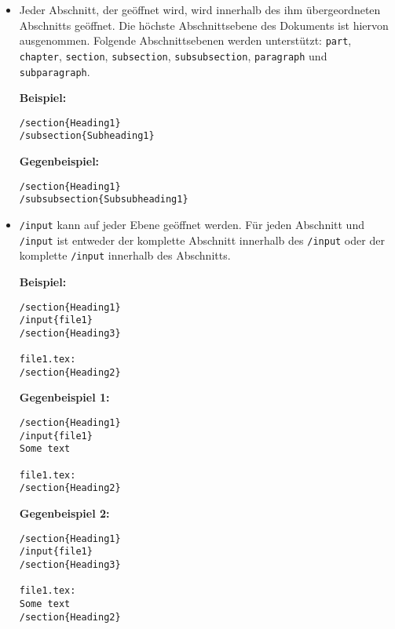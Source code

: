 \begin{itemize}
  \item Jeder Abschnitt, der geöffnet wird, wird innerhalb des ihm übergeordneten Abschnitts geöffnet.
  Die höchste Abschnittsebene des Dokuments ist hiervon ausgenommen.
  Folgende Abschnittsebenen werden unterstützt:
  \verb|part|, \verb|chapter|, \verb|section|, \verb|subsection|, \verb|subsubsection|, \verb|paragraph| und
  \verb|subparagraph|.

  \textbf{Beispiel:}
  \begin{verbatim}
/section{Heading1}
/subsection{Subheading1}
  \end{verbatim}

  \textbf{Gegenbeispiel:}
  \begin{verbatim}
/section{Heading1}
/subsubsection{Subsubheading1}
  \end{verbatim}

  \clearpage

  \item \verb|/input| kann auf jeder Ebene geöffnet werden.
  Für jeden Abschnitt und \verb|/input| ist entweder der komplette Abschnitt innerhalb des \verb|/input| oder der
  komplette \verb|/input| innerhalb des Abschnitts.

  \textbf{Beispiel:}
  \begin{verbatim}
/section{Heading1}
/input{file1}
/section{Heading3}

file1.tex:
/section{Heading2}
  \end{verbatim}

  \textbf{Gegenbeispiel 1:}
  \begin{verbatim}
/section{Heading1}
/input{file1}
Some text

file1.tex:
/section{Heading2}
  \end{verbatim}

  \textbf{Gegenbeispiel 2:}
  \begin{verbatim}
/section{Heading1}
/input{file1}
/section{Heading3}

file1.tex:
Some text
/section{Heading2}
  \end{verbatim}
\end{itemize}
